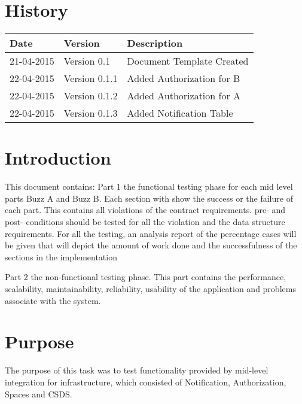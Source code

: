 \documentclass[12pt]{article}
\begin{document}


\section{History}
\begin{tabular}{|p{3cm}|p{5cm}|p{6cm}|}

\hline
Date & Version & Description\\ %
\hline
21-04-2015 & Version 0.1 & Document Template Created\\ %
\hline
22-04-2015 & Version 0.1.1 & Added Authorization for B\\ %
\hline
22-04-2015 & Version 0.1.2 & Added Authorization for A\\ %
\hline
22-04-2015 & Version 0.1.3 & Added Notification Table\\ %
\hline


\end{tabular}

\newpage
\tableofcontents
\newpage

\section{Introduction} %
This document contains:
Part 1 the functional testing phase for each mid level parts Buzz A and Buzz B.
Each section with show the success or the failure of each part. This contains all violations of the contract requirements.
pre- and post- conditions should be tested for all the violation and the data structure requirements.
For all the testing, an analysis report of the percentage cases will be given that will depict the amount of work done and the successfulness of the sections in the implementation

Part 2 the non-functional testing phase.
This part contains the performance, scalability, maintainability, reliability, usability of the application and problems associate with the system.

\section{Purpose} %
The purpose of this task was to test functionality provided by mid-level integration for infrastructure, which consisted of Notification, Authorization, Spaces and CSDS.
\end{document}
